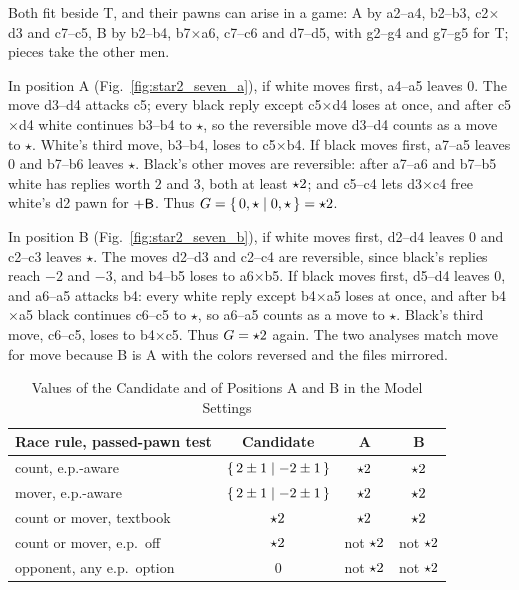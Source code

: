 Both fit beside T, and their pawns can arise in a game: A by a2--a4, b2--b3, c2$\times$d3 and c7--c5, B by
b2--b4, b7$\times$a6, c7--c6 and d7--d5, with g2--g4 and g7--g5 for T; pieces take the other men.

In position A (Fig.~\ref{fig:star2_seven_a}), if white moves first, a4--a5 leaves $0$. The move d3--d4 attacks
c5; every black reply except c5$\times$d4 loses at once, and after c5$\times$d4 white continues b3--b4 to
$\star$, so the reversible move d3--d4 counts as a move to $\star$. White's third move, b3--b4, loses to
c5$\times$b4. If black moves first, a7--a5 leaves $0$ and b7--b6 leaves $\star$. Black's other moves are
reversible: after a7--a6 and b7--b5 white has replies worth $2$ and $3$, both at least $\mathord{\star2}$; and c5--c4
lets d3$\times$c4 free white's d2 pawn for $+\mathsf{B}$. Thus
$G=\{\,0,\star \mid 0,\star\,\}=\mathord{\star2}$.

In position B (Fig.~\ref{fig:star2_seven_b}), if white moves first, d2--d4 leaves $0$ and c2--c3 leaves
$\star$. The moves d2--d3 and c2--c4 are reversible, since black's replies reach $-2$ and $-3$, and b4--b5
loses to a6$\times$b5. If black moves first, d5--d4 leaves $0$, and a6--a5 attacks b4: every white reply except
b4$\times$a5 loses at once, and after b4$\times$a5 black continues c6--c5 to $\star$, so a6--a5 counts as a move
to $\star$. Black's third move, c6--c5, loses to b4$\times$c5. Thus $G=\mathord{\star2}$ again. The two analyses
match move for move because B is A with the colors reversed and the files mirrored.

\begin{table}[!t]
\centering
\caption{Values of the Candidate and of Positions A and B in the Model Settings}
\label{tab:star2_settings}
\footnotesize
\setlength{\tabcolsep}{4pt}
\begin{tabular}{@{}lccc@{}}
\toprule
Race rule, passed-pawn test & Candidate & A & B\\
\midrule
count, e.p.-aware & $\{\,2\pm1 \mid -2\pm1\,\}$ & $\mathord{\star2}$ & $\mathord{\star2}$\\
mover, e.p.-aware & $\{\,2\pm1 \mid -2\pm1\,\}$ & $\mathord{\star2}$ & $\mathord{\star2}$\\
count or mover, textbook & $\mathord{\star2}$ & $\mathord{\star2}$ & $\mathord{\star2}$\\
count or mover, e.p.\ off & $\mathord{\star2}$ & not $\mathord{\star2}$ & not $\mathord{\star2}$\\
opponent, any e.p.\ option & $0$ & not $\mathord{\star2}$ & not $\mathord{\star2}$\\
\bottomrule
\end{tabular}
\end{table}


